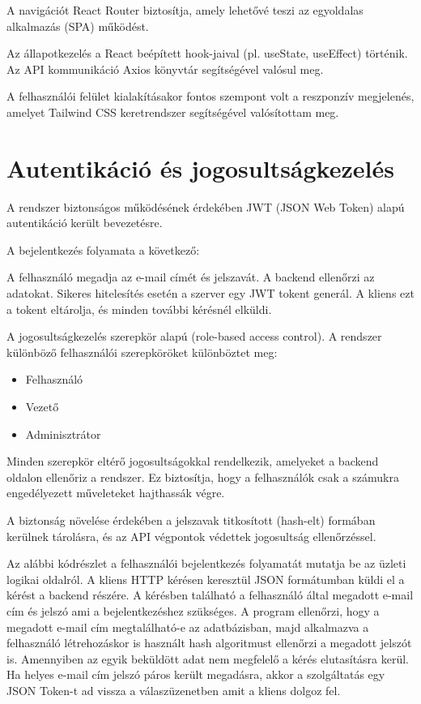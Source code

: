 \documentclass[
]{thesis-ekf}
\theoremstyle{definition}
\theoremstyle{remark}
\begin{document}
A navigációt React Router biztosítja, amely lehetővé teszi az egyoldalas alkalmazás (SPA) működést.

Az állapotkezelés a React beépített hook-jaival (pl. useState, useEffect) történik. Az API kommunikáció Axios könyvtár segítségével valósul meg.

A felhasználói felület kialakításakor fontos szempont volt a reszponzív megjelenés, amelyet Tailwind CSS keretrendszer segítségével valósítottam meg.

\section{Autentikáció és jogosultságkezelés}
A rendszer biztonságos működésének érdekében JWT (JSON Web Token) alapú autentikáció került bevezetésre.

A bejelentkezés folyamata a következő:

A felhasználó megadja az e-mail címét és jelszavát. A backend ellenőrzi az adatokat. Sikeres hitelesítés esetén a szerver egy JWT tokent generál. A kliens ezt a tokent eltárolja, és minden további kérésnél elküldi.

A jogosultságkezelés szerepkör alapú (role-based access control). A rendszer különböző felhasználói szerepköröket különböztet meg:

\begin{itemize}
	\item Felhasználó
	\item Vezető
	\item Adminisztrátor
\end{itemize}

Minden szerepkör eltérő jogosultságokkal rendelkezik, amelyeket a backend oldalon ellenőriz a rendszer. Ez biztosítja, hogy a felhasználók csak a számukra engedélyezett műveleteket hajthassák végre.

A biztonság növelése érdekében a jelszavak titkosított (hash-elt) formában kerülnek tárolásra, és az API végpontok védettek jogosultság ellenőrzéssel.

\pagebreak

Az alábbi kódrészlet a felhasználói bejelentkezés folyamatát mutatja be az üzleti logikai oldalról. A kliens HTTP kérésen keresztül JSON formátumban küldi el a kérést a backend részére. A kérésben található a felhasználó által megadott e-mail cím és jelszó ami a bejelentkezéshez szükséges. A program ellenőrzi, hogy a megadott e-mail cím megtalálható-e az adatbázisban, majd alkalmazva a felhasználó létrehozáskor is használt hash algoritmust ellenőrzi a megadott jelszót is. Amennyiben az egyik beküldött adat nem megfelelő a kérés elutasításra kerül. Ha helyes e-mail cím jelszó páros került megadásra, akkor a szolgáltatás egy JSON Token-t ad vissza a válaszüzenetben amit a kliens dolgoz fel.
\end{document}
